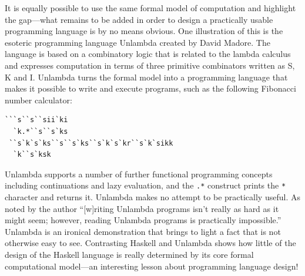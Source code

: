 It is equally possible to use the same formal model of computation and highlight the gap---what
remains to be added in order to design a practically usable programming language is by
no means obvious. One illustration of this is the esoteric programming language
Unlambda created by David Madore. The language is based on a
combinatory logic that is related to the lambda calculus and expresses computation in terms
of three primitive combinators written as S, K and I. Unlambda turns the formal model into a
programming language that makes it possible to write and execute programs, such as the following
Fibonacci number calculator:

\begin{lstlisting}
```s``s``sii`ki
  `k.*``s``s`ks
 ``s`k`s`ks``s``s`ks``s`k`s`kr``s`k`sikk
  `k``s`ksk
\end{lstlisting}

Unlambda supports a number of further functional programming concepts including continuations
and lazy evaluation, and the \texttt{.*} construct prints the \texttt{*} character and returns it.
Unlambda makes no attempt to be practically useful. As noted by the author ``[w]riting Unlambda
programs isn't really as hard as it might seem; however, reading Unlambda programs is practically
impossible.''
Unlambda is an ironical demonstration that brings to light a fact that is not otherwise easy
to see. Contrasting Haskell and Unlambda shows how little of the design of the Haskell language is
really determined by its core formal computational model---an interesting lesson about programming
language design!


